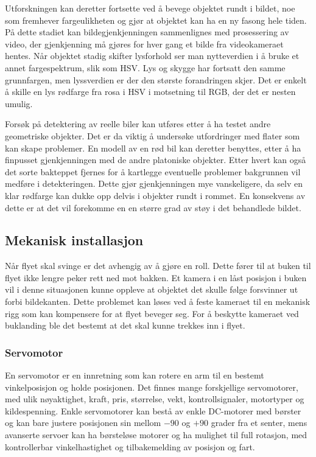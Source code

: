 Utforskningen kan deretter fortsette ved å bevege objektet rundt i bildet, noe som fremhever fargeulikheten og gjør at objektet kan ha en ny fasong hele tiden. På dette stadiet kan bildegjenkjenningen sammenlignes med prosessering av video, der gjenkjenning må gjøres for hver gang et bilde fra videokameraet hentes. Når objektet stadig skifter lysforhold ser man nytteverdien i å bruke et annet fargespektrum, slik som HSV. Lys og skygge har fortsatt den samme grunnfargen, men lyssverdien er der den største forandringen skjer. Det er enkelt å skille en lys rødfarge fra rosa i HSV i motsetning til RGB, der det er nesten umulig. 

Forsøk på detektering av reelle biler kan utføres etter å ha testet andre geometriske objekter. Det er da viktig å undersøke utfordringer med flater som kan skape problemer. En modell av en rød bil kan deretter benyttes, etter å ha finpusset gjenkjenningen med de andre platoniske objekter. Etter hvert kan også det sorte bakteppet fjernes for å kartlegge eventuelle problemer bakgrunnen vil medføre i detekteringen. Dette gjør gjenkjenningen mye vanskeligere, da selv en klar rødfarge kan dukke opp delvis i objekter rundt i rommet. En konsekvens av dette er at det vil forekomme en en større grad av støy i det behandlede bildet.  

\subsection{Mekanisk installasjon}
Når flyet skal svinge er det avhengig av å gjøre en roll. Dette fører til at buken til flyet ikke lengre peker rett ned mot bakken. Et kamera i en låst posisjon i buken vil i denne situasjonen kunne oppleve at objektet det skulle følge forsvinner ut forbi bildekanten. Dette problemet kan løses ved å feste kameraet til en mekanisk rigg som kan kompensere for at flyet beveger seg. For å beskytte kameraet ved buklanding ble det bestemt at det skal kunne trekkes inn i flyet.


\subsubsection{Servomotor}

En servomotor er en innretning som kan rotere en arm til en bestemt vinkelposisjon og holde posisjonen. Det finnes mange forskjellige servomotorer, med ulik nøyaktighet, kraft, pris, størrelse, vekt, kontrollsignaler, motortyper og kildespenning. Enkle servomotorer kan bestå av enkle DC-motorer med børster og kan bare justere posisjonen sin mellom $-90$ og $+90$ grader fra et senter, mens avanserte servoer kan ha børsteløse motorer og ha mulighet til full rotasjon, med kontrollerbar vinkelhastighet og tilbakemelding av posisjon og fart.

